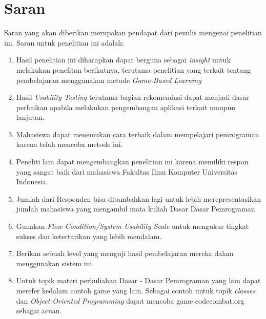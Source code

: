 \section{Saran}
Saran yang akan diberikan merupakan pendapat dari penulis mengenai penelitian ini. Saran untuk penelitian ini adalah:
\begin{enumerate}
	\item Hasil penelitian ini diharapkan dapat berguna sebagai \textit{insight} untuk melakukan penelitan berikutnya, terutama penelitian yang terkait tentang pembelajaran menggunakan metode \textit{Game-Based Learning}
	\item Hasil \textit{Usability Testing} terutama bagian rekomendasi dapat menjadi dasar perbaikan apabila melakukan pengembangan aplikasi terkait maupun lanjutan.
	\item Mahasiswa dapat menemukan cara terbaik dalam mempelajari pemrograman karena telah mencoba metode ini.
	\item Peneliti lain dapat mengembangkan penelitian ini karena memiliki respon yang sangat baik dari mahasiswa Fakultas Ilmu Komputer Universitas Indonesia.
	\item Jumlah dari Responden bisa ditambahkan lagi untuk lebih merepresentasikan jumlah mahasiswa yang mengambil mata kuliah Dasar Dasar Pemrograman
	\item Gunakan \textit{Flow Condition/System Usability Scale} untuk mengukur tingkat sukses dan ketertarikan yang lebih mendalam.
	\item Berikan sebuah level yang menguji hasil pembelajaran mereka dalam menggunakan sistem ini.
	\item Untuk topik materi perkuliahan Dasar - Dasar Pemrograman yang lain dapat merefer kedalam contoh game yang lain. Sebagai contoh untuk topik \textit{classes} dan  \textit{Object-Oriented Programming} dapat mencoba game codecombat.org sebagai acuan.
\end{enumerate}

